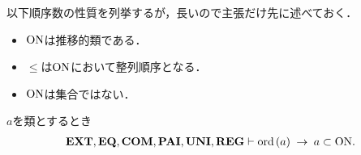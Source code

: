 	以下順序数の性質を列挙するが，長いので主張だけ先に述べておく．
	\begin{itemize}
		\item $\mathrm{ON}$は推移的類である．
		\item $\leq$は$\mathrm{ON}$において整列順序となる．
		\item $\mathrm{ON}$は集合ではない．
	\end{itemize}
	
	\begin{screen}
		\begin{thm}
		\label{thm:transitive_totally_ordered_class}
			$a$を類とするとき
			\begin{align}
				\mbox{{\bf EXT}},\mbox{{\bf EQ}},\mbox{\bf COM},\mbox{{\bf PAI}},\mbox{{\bf UNI}},\mbox{{\bf REG}} \vdash 
				\operatorname*{ord}\hspace{0.15em}(a) \hspace{0.25em}\rightarrow\hspace{0.25em} a \subset \mathrm{ON}.
			\end{align}
		\end{thm}
	\end{screen}
	
